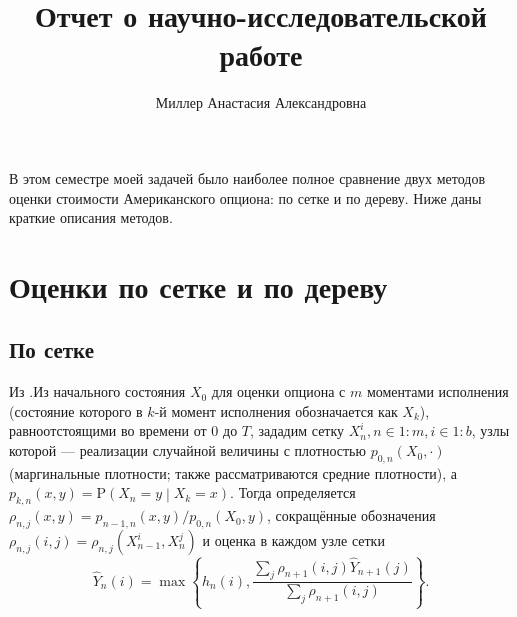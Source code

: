 \documentclass[specialist,
               substylefile = ../spbu.rtx,
               subf,href,colorlinks=true, 10pt]{disser}
\newcommand{\prob}[1]{\mathrm{P}\left(#1\right)}
\begin{document}
%
%


\title{Отчет о научно-исследовательской работе}


\author{Миллер Анастасия Александровна}


\date{\number\year}

\begin{large}
\maketitle
\end{large}
\intro
В этом семестре моей задачей было наиболее полное сравнение двух методов оценки стоимости Американского опциона: по сетке и по дереву. Ниже даны краткие описания методов.
\section{Оценки по сетке и по дереву} %
\subsection{По сетке}\label{sub:mesh} %
Из \cite{Broadie2004,Kashtanov2015}.Из начального состояния $X_0$ для оценки опциона с $m$ моментами исполнения (состояние которого в $k$-й момент исполнения обозначается как $X_k$), равноотстоящими во времени от 0 до $T$, зададим сетку $X_n^i, n\in 1\mathbin{:}m, i \in 1\mathbin{:}b$, узлы которой --- реализации случайной величины с плотностью $p_{0, n}(X_0, \cdot)$ (маргинальные плотности; также рассматриваются средние плотности), а $p_{k, n}(x, y) = \prob{X_n = y \middle\vert X_k = x}$. Тогда определяется $\rho_{n, j}(x, y) = p_{n-1, n}(x, y) / p_{0, n}(X_0, y)$, сокращённые обозначения $\rho_{n, j}(i, j) = \rho_{n, j}(X_{n-1}^i, X_n^j)$ и оценка в каждом узле сетки
$$\hat Y_n(i) = \max\left\lbrace h_n(i), \frac{\sum_j \rho_{n+1}(i, j) \hat Y_{n+1}(j)}{\sum_j \rho_{n+1}(i, j)} \right\rbrace.$$
\end{document}
